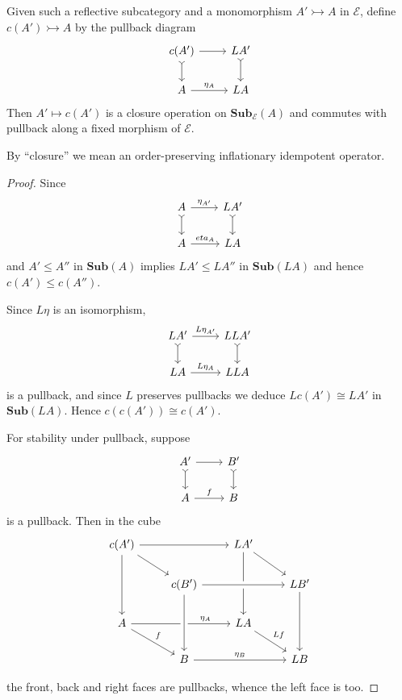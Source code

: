 \documentclass[a4paper]{article}
\renewcommand{\c}[1]{\mathbf{#1}}
\newcommand{\Sub}{{\c{Sub}}}
\newcommand{\mono}{\rightarrowtail}
\begin{document}
\begin{lemma}
  Given such a reflective subcategory and a monomorphism \(A' \mono A\) in \(\mathcal E\), define \(c(A') \mono A\) by the pullback diagram
  \[
    \begin{tikzcd}
      c(A') \ar[r] \ar[d, tail] & LA' \ar[d, tail] \\
      A \ar[r, "\eta_A"] & LA
    \end{tikzcd}
  \]
  Then \(A' \mapsto c(A')\) is a closure operation on \(\Sub_{\mathcal E}(A)\) and commutes with pullback along a fixed morphism of \(\mathcal E\).
\end{lemma}

By ``closure'' we mean an order-preserving inflationary idempotent operator.

\begin{proof}
  Since
  \[
    \begin{tikzcd}
      A \ar[r, "\eta_{A'}"] \ar[d, tail] & LA' \ar[d, tail] \\
      A \ar[r, "eta_A"] & LA
    \end{tikzcd}
  \]
  and \(A' \leq A''\) in \(\Sub(A)\) implies \(LA' \leq LA''\) in \(\Sub(LA)\) and hence \(c(A') \leq c(A'')\).

  Since \(L\eta\) is an isomorphism,
  \[
    \begin{tikzcd}
      LA' \ar[r, "L\eta_{A'}"] \ar[d, tail] & LLA' \ar[d, tail] \\
      LA \ar[r, "L\eta_A"] & LLA
    \end{tikzcd}
  \]
  is a pullback, and since \(L\) preserves pullbacks we deduce \(Lc(A') \cong LA'\) in \(\Sub(LA)\). Hence \(c(c(A')) \cong c(A')\).

  For stability under pullback, suppose
  \[
    \begin{tikzcd}
      A' \ar[r] \ar[d, tail] & B' \ar[d, tail] \\
      A \ar[r, "f"] & B
    \end{tikzcd}
  \]
  is a pullback. Then in the cube
  \[
    \begin{tikzcd}
      c(A') \ar[rr] \ar[dr] \ar[dd] & & LA' \ar[dr] \ar[dd] \\
      & c(B') \ar[rr, crossing over] & & LB' \ar[dd] \\
      A \ar[rr, "\eta_A", near end] \ar[dr, "f"] && LA \ar[dr, "Lf"] \\
      & B \ar[rr, "\eta_B"] \ar[from=uu, crossing over] && LB
    \end{tikzcd}
  \]

  the front, back and right faces are pullbacks, whence the left face is too.
\end{proof}
\end{document}
